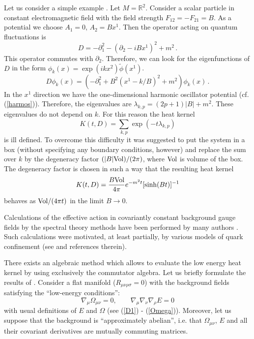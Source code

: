 Let us consider a simple example \cite{Blau:1991iz}. Let
$M=\mathbb{R}^2$. Consider a scalar particle in constant
electromagnetic field with the field strength $F_{12}=-F_{21}=B$.
As a potential we choose $A_1=0$, $A_2=Bx^1$. Then the operator
acting on quantum fluctuations is
\begin{equation}
D=-\partial_1^2-(\partial_2 -iBx^1)^2 +m^2 \,.\label{cmagD}
\end{equation}
This operator commutes with $\partial_2$. Therefore, we can look
for the eigenfunctions of $D$ in the form 
$\phi_k (x)=\exp (ikx^2) \tilde\phi (x^1)$. 
\begin{equation}
D\phi_k (x) = \left( -\partial_1^2 +B^2 (x^1 - k/B)^2 +m^2 \right)
\phi_k (x) \,.\label{cmDk}
\end{equation}
In the $x^1$ direction we have the one-dimensional harmonic
oscillator potential (cf. (\ref{harmos})). Therefore, the 
eigenvalues are $\lambda_{k,p}= (2p+1)|B|+m^2$. These eigenvalues
do not depend on $k$. For this reason the heat kernel
\begin{equation}
K(t,D)=\sum_{k,p} \exp (-t\lambda_{k,p}) \label{cmagKt}
\end{equation}
is ill defined. To overcome this difficulty it was suggested 
\cite{Blau:1991iz} to put the system in a box (without specifying
any boundary conditions, however) and replace the sum over $k$
by the degeneracy factor $(|B| {\rm Vol})/(2\pi )$, where ${\rm Vol}$
is volume of the box. The degeneracy factor is chosen in such a way
that the resulting heat kernel
\begin{equation}
K(t,D)= \frac{B{\rm Vol}}{4\pi } e^{-m^2t} [{\rm sinh} (Bt)]^{-1}
\label{cmagKB}
\end{equation}
behaves as ${\rm Vol}/(4\pi t)$ in the limit $B\to 0$.

Calculations of the effective action in covariantly constant
background gauge fields by the spectral theory methods have 
been performed by many authors 
\cite{Batalin:1977uv,Dittrich:1983ej,Elizalde:1984yb,
Elizalde:1985zv,Blau:1991iz}. Such calculations were motivated, at least
partially, by various models of quark confinement (see 
\cite{Pagels:1978dd,Adler:1982rk} and references therein).

There exists an algebraic method \cite{Avramidi:1993yf,Avramidi:1995ik} 
which allows to evaluate the low energy heat kernel by using 
exclusively the commutator algebra. Let us briefly formulate the
results of \cite{Avramidi:1993yf,Avramidi:1995ik}. Consider a flat
manifold ($R_{\mu\nu\rho\sigma}=0$) with the background fields
satisfying the ``low-energy conditions'':
\begin{equation}
\nabla_\mu \Omega_{\mu\nu}=0,\qquad
\nabla_\mu\nabla_\nu\nabla_\rho E=0 
\label{lowecon}
\end{equation}
with usual definitions of $E$ and $\Omega$ (see (\ref{D1}) - 
(\ref{Omega})). Moreover, let us suppose that the background
is ``approximately abelian'', i.e. that $\Omega_{\mu\nu}$,
$E$ and all their covariant derivatives are mutually commuting matrices. 

